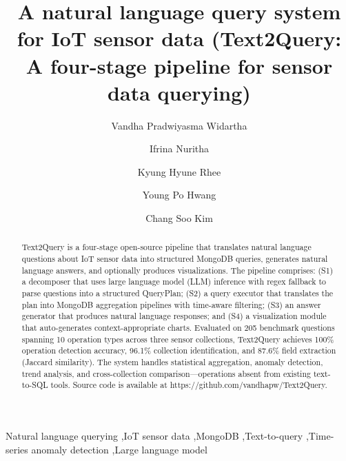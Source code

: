 \documentclass[preprint,12pt, a4paper]{elsarticle}
\begin{document}
\begin{frontmatter}

\title{A natural language query system for IoT sensor data (Text2Query: A four-stage pipeline for sensor data querying)}

\author[A]{Vandha Pradwiyasma Widartha}
\author[A]{Ifrina Nuritha}
\author[C]{Kyung Hyune Rhee}
\author[D]{Young Po Hwang}
\author[A]{Chang Soo Kim}

\address[A]{Department of Information Systems, Pukyong National University, Busan 48513, Republic of Korea}
\address[B]{Department of Information System, University of Jember, Indonesia 68121, Republic of Indonesia}
\address[C]{Division of Computer Engineering and AI, Pukyong National University, Busan 48513, Republic of Korea}
\address[D]{Research Center, Hanyoung DS, Inc., Seoul 07600, Republic of Korea}


\begin{abstract}
Text2Query is a four-stage open-source pipeline that translates natural language questions about IoT sensor data into structured MongoDB queries, generates natural language answers, and optionally produces visualizations. The pipeline comprises: (S1) a decomposer that uses large language model (LLM) inference with regex fallback to parse questions into a structured QueryPlan; (S2) a query executor that translates the plan into MongoDB aggregation pipelines with time-aware filtering; (S3) an answer generator that produces natural language responses; and (S4) a visualization module that auto-generates context-appropriate charts. Evaluated on 205 benchmark questions spanning 10 operation types across three sensor collections, Text2Query achieves 100\% operation detection accuracy, 96.1\% collection identification, and 87.6\% field extraction (Jaccard similarity). The system handles statistical aggregation, anomaly detection, trend analysis, and cross-collection comparison—operations absent from existing text-to-SQL tools. Source code is available at https://github.com/vandhapw/Text2Query.
\end{abstract}

\begin{keyword}
Natural language querying \sep IoT sensor data \sep MongoDB \sep Text-to-query \sep Time-series anomaly detection \sep Large language model
\end{keyword}

\end{frontmatter}
\end{document}
